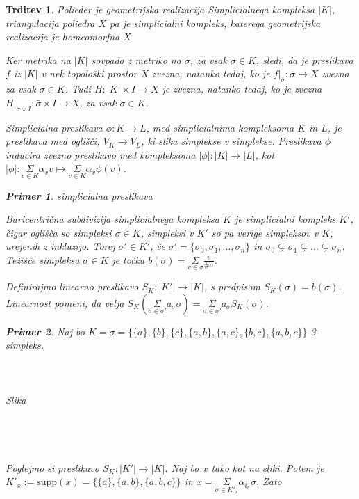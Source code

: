 \documentclass[a4paper,12pt]{article}
\DeclareRobustCommand{\si}{
    \bar{\sigma}
}
\theoremstyle{definition}
\theoremstyle{plain}
\theoremstyle{definition}
\newtheorem{primer}{Primer}
\theoremstyle{plain}
\newtheorem{trditev}{Trditev}
\theoremstyle{plain}
\theoremstyle{plain}
\theoremstyle{plain}
\begin{document}
\begin{trditev}
\textit{Polieder} je geometrijska realizacija Simplicialnega kompleksa $|K|$, \textit{triangulacija} poliedra $X$ pa je simplicialni kompleks, katerega geometrijska realizacija je homeomorfna $X$.

Ker metrika na $|K|$ sovpada z metriko na $\bar{\sigma}$, za vsak $\sigma\in K$, sledi, da je preslikava $f$ iz $|K|$ v nek topološki prostor $X$ zvezna, natanko tedaj, ko je $f|_{\bar{\sigma}}: \bar{\sigma} \rightarrow X$ zvezna za vsak $\sigma\in K$. Tudi $H:|K|\times I \rightarrow X$ je zvezna, natanko tedaj, ko je zvezna $H|_{\si\times I}:\si\times I \rightarrow X$, za vsak $\sigma\in K$.


\textit{Simplicialna preslikava} $\phi :K \rightarrow L$, med 
simplicialnima kompleksoma $K$ in $L$, je preslikava med 
oglišči, $V_K \rightarrow V_L$, ki slika simplekse v 
simplekse. Preslikava $\phi$ inducira zvezno preslikavo med 
kompleksoma $|\phi| :|K| \rightarrow |L|$, kot $|\phi|:
\underset{v \in K}{\Sigma}\alpha_v v \mapsto
\underset{v \in K}{\Sigma}\alpha_v \phi(v)$.

\begin{primer}
    simplicialna preslikava
\end{primer}
    
\textit{Baricentrična subdivizija} simplicialnega kompleksa 
$K$ je simplicialni kompleks $K'$, čigar oglišča so 
simpleksi $\sigma \in K$, simpleksi v $K'$ so pa verige 
simpleksov v $K$, urejenih z inkluzijo. Torej $\sigma' \in K'$, če $\sigma' = \{\sigma_0, \sigma_1,...,\sigma_n\}$ in $\sigma_0\subsetneq \sigma_1\subsetneq...\subsetneq\sigma_n$. \textit{Težišče} simpleksa $\sigma \in K$ je točka $b(\sigma)=\underset{v\in \sigma}{\Sigma} \frac{v}{\#\sigma}$.

Definirajmo linearno preslikavo $S_K: |K'| \rightarrow |K|$, s predpisom $S_K(\sigma) = b(\sigma)$. Linearnost pomeni, da velja $S_K(\underset{\sigma\in \sigma'}{\Sigma} a_\sigma \sigma) =  \underset{\sigma\in \sigma'}{\Sigma} a_\sigma S_K(\sigma).$

\begin{primer}
Naj bo $K=\sigma=\{\{a\},\{b\},\{c\},\{a,b\},\{a,c\},\{b,c\},\{a,b,c\}\}$ 3-simpleks.
\\
\\
\\
\\
Slika
\\
\\
\\
\\
\\
Poglejmo si preslikavo $S_K: |K'| \rightarrow |K|$. Naj bo $x$ tako kot na sliki. %
Potem je 
$K'_x:=\text{supp}(x)=\{\{a\},\{a,b\},\{a,b,c\}\}$ in $x= \underset{\sigma\in K'_x}{\Sigma} \alpha_{i_\sigma} \sigma$. Zato


\end{primer}
\end{trditev}
\end{document}
